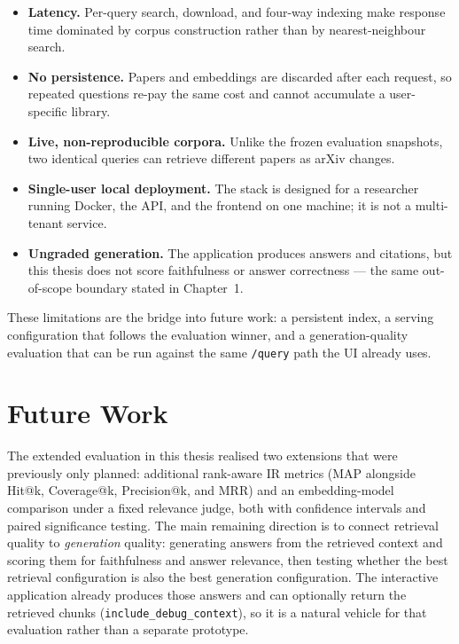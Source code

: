 \documentclass[12pt,a4paper,titlepage,oneside]{book}
\begin{document}
\begin{itemize}
    \item \textbf{Latency.} Per-query search, download, and four-way indexing make response time dominated by corpus construction rather than by nearest-neighbour search.
    \item \textbf{No persistence.} Papers and embeddings are discarded after each request, so repeated questions re-pay the same cost and cannot accumulate a user-specific library.
    \item \textbf{Live, non-reproducible corpora.} Unlike the frozen evaluation snapshots, two identical queries can retrieve different papers as arXiv changes.
    \item \textbf{Single-user local deployment.} The stack is designed for a researcher running Docker, the API, and the frontend on one machine; it is not a multi-tenant service.
    \item \textbf{Ungraded generation.} The application produces answers and citations, but this thesis does not score faithfulness or answer correctness --- the same out-of-scope boundary stated in Chapter~1.
\end{itemize}

These limitations are the bridge into future work: a persistent index, a serving configuration that follows the evaluation winner, and a generation-quality evaluation that can be run against the same \texttt{/query} path the UI already uses.

\chapter{Future Work}

The extended evaluation in this thesis realised two extensions that were previously only planned: additional rank-aware IR metrics (MAP alongside Hit@k, Coverage@k, Precision@k, and MRR) and an embedding-model comparison under a fixed relevance judge, both with confidence intervals and paired significance testing. The main remaining direction is to connect retrieval quality to \emph{generation} quality: generating answers from the retrieved context and scoring them for faithfulness and answer relevance, then testing whether the best retrieval configuration is also the best generation configuration. The interactive application already produces those answers and can optionally return the retrieved chunks (\texttt{include\_debug\_context}), so it is a natural vehicle for that evaluation rather than a separate prototype.
\end{document}

